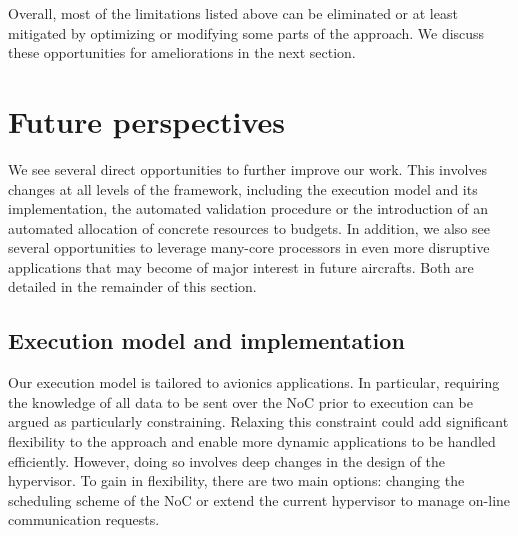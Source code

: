 \documentclass[main.tex]{subfiles}
\begin{document}
Overall, most of the limitations listed above can be eliminated or at least mitigated by optimizing or modifying some parts of the approach. We discuss these opportunities for ameliorations in the next section.


\section{Future perspectives}
We see several direct opportunities to further improve our work. This involves changes at all levels of the framework, including the execution model and its implementation, the automated validation procedure or the introduction of an automated allocation of concrete resources to budgets. In addition, we also see several opportunities to leverage many-core processors in even more disruptive applications that may become of major interest in future aircrafts. Both are detailed in the remainder of this section.

\subsection{Execution model and implementation}
Our execution model is tailored to avionics applications. In particular, requiring the knowledge of all data to be sent over the NoC prior to execution can be argued as particularly constraining. Relaxing this constraint could add significant flexibility to the approach and enable more dynamic applications to be handled efficiently. However, doing so involves deep changes in the design of the hypervisor. To gain in flexibility, there are two main options: changing the scheduling scheme of the NoC or extend the current hypervisor to manage on-line communication requests.
\end{document}
